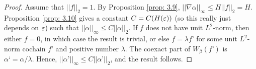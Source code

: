 \begin{proof}
Assume that $||f||_2 = 1$. By Proposition \ref{prop: 3.9}, $||\nabla \alpha ||_{\infty} \leq H||f||_2 = H$.  Proposition \ref{prop: 3.10} gives a constant $C = C(H(\varepsilon))$ (so this really just depends on $\varepsilon$) such that $||\alpha||_{\infty}\leq C||\alpha||_2$. If $f$ does not have unit $L^2$-norm, then either $f=0$, in which case the result is trivial, or else $f = \lambda f’$ for some unit $L^2$-norm cochain $f’$ and positive number $\lambda$.
The coexact part of $W_{\beta}(f’)$ is $\alpha ‘ = \alpha/\lambda$. Hence, $||\alpha’||_{\infty}\leq C||\alpha’||_2$, and the result follows. \end{proof}

